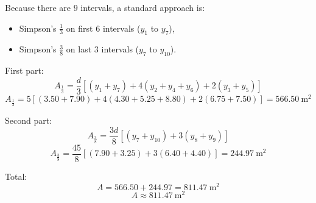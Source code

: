 \documentclass[12pt]{article}
\begin{document}
Because there are $9$ intervals, a standard approach is:
\begin{itemize}
    \item Simpson's $\frac13$ on first $6$ intervals ($y_1$ to $y_7$),
    \item Simpson's $\frac38$ on last $3$ intervals ($y_7$ to $y_{10}$).
\end{itemize}

First part:
\[
A_{\frac13}=\frac{d}{3}\left[(y_1+y_7)+4(y_2+y_4+y_6)+2(y_3+y_5)\right]
\]
\[
A_{\frac13}=5\left[(3.50+7.90)+4(4.30+5.25+8.80)+2(6.75+7.50)\right]=566.50\ \text{m}^2
\]

Second part:
\[
A_{\frac38}=\frac{3d}{8}\left[(y_7+y_{10})+3(y_8+y_9)\right]
\]
\[
A_{\frac38}=\frac{45}{8}\left[(7.90+3.25)+3(6.40+4.40)\right]=244.97\ \text{m}^2
\]

Total:
\[
A=566.50+244.97=811.47\ \text{m}^2
\]
\[
\boxed{A\approx 811.47\ \text{m}^2}
\]
\end{document}
